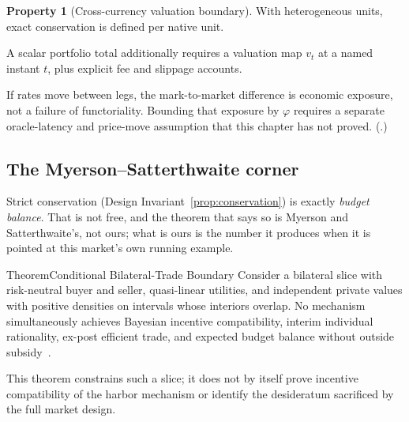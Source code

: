 \documentclass[11pt,a4paper]{article}
\theoremstyle{definition}
\newtheorem{property}{Property}[section]
\theoremstyle{definition}
\theoremstyle{remark}
\begin{document}
\begin{property}[Cross-currency valuation boundary]\label{thm:lax}
\setlength{\parskip}{4pt plus 1pt}
With heterogeneous units, exact conservation is defined per native unit. 

A scalar
portfolio total additionally requires a valuation map $v_t$ at a named instant
$t$, plus explicit fee and slippage accounts. 

If rates move between legs, the
mark-to-market difference is economic exposure, not a failure of functoriality.
Bounding that exposure by $\varphi$ requires a separate oracle-latency and price-move
assumption that this chapter has not proved. (\Open{}.)
\end{property}


\subsection{The Myerson--Satterthwaite corner}\label{sec:ms}

Strict conservation (Design Invariant~\ref{prop:conservation}) is exactly \emph{budget
balance}. That is not free, and the theorem that says so is Myerson and
Satterthwaite's, not ours; what is ours is the number it produces when it is
pointed at this market's own running example.

\begin{pdclaim}{Theorem}{Conditional Bilateral-Trade Boundary}
\setlength{\parskip}{4pt plus 1pt}
\label{thm:ms}
Consider a bilateral slice with risk-neutral buyer and seller, quasi-linear
utilities, and independent private values with positive densities on intervals
whose interiors overlap. No mechanism simultaneously achieves Bayesian incentive
compatibility, interim individual rationality, ex-post efficient trade, and
expected budget balance without outside subsidy~.

This theorem constrains such a slice; it does not by
itself prove incentive compatibility of the harbor mechanism or identify the
desideratum sacrificed by the full market design.
\end{pdclaim}
\end{document}
